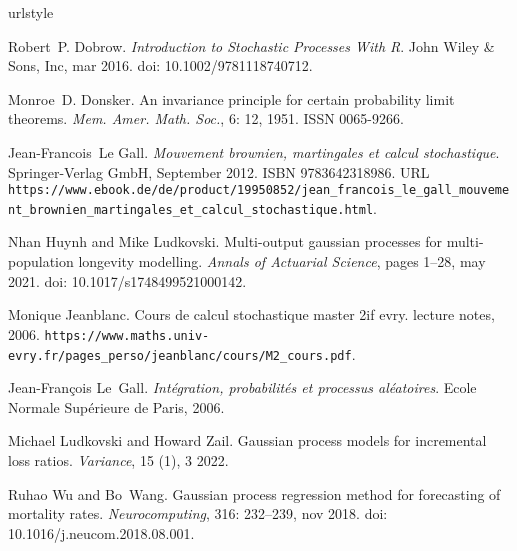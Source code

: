\begin{thebibliography}{8}
\providecommand{\natexlab}[1]{#1}
\providecommand{\url}[1]{\texttt{#1}}
\expandafter\ifx\csname urlstyle\endcsname\relax
  \providecommand{\doi}[1]{doi: #1}\else
  \providecommand{\doi}{doi: \begingroup \urlstyle{rm}\Url}\fi

Robert~P. Dobrow.
\newblock \emph{Introduction to Stochastic Processes With R}.
\newblock John Wiley {\&} Sons, Inc, mar 2016.
\newblock \doi{10.1002/9781118740712}.

Monroe~D. Donsker.
\newblock An invariance principle for certain probability limit theorems.
\newblock \emph{Mem. Amer. Math. Soc.}, 6: 12, 1951.
\newblock ISSN 0065-9266.

Jean-Francois~Le Gall.
\newblock \emph{Mouvement brownien, martingales et calcul stochastique}.
\newblock Springer-Verlag GmbH, September 2012.
\newblock ISBN 9783642318986.
\newblock URL
  \url{https://www.ebook.de/de/product/19950852/jean_francois_le_gall_mouvement_brownien_martingales_et_calcul_stochastique.html}.

Nhan Huynh and Mike Ludkovski.
\newblock Multi-output gaussian processes for multi-population longevity
  modelling.
\newblock \emph{Annals of Actuarial Science}, pages 1--28, may 2021.
\newblock \doi{10.1017/s1748499521000142}.

Monique Jeanblanc.
\newblock Cours de calcul stochastique master 2if evry.
\newblock lecture notes, 2006.
\newblock
  \url{https://www.maths.univ-evry.fr/pages_perso/jeanblanc/cours/M2_cours.pdf}.

Jean-Fran{\c{c}}ois Le~Gall.
\newblock \emph{Int{\'e}gration, probabilit{\'e}s et processus al{\'e}atoires}.
\newblock Ecole Normale Sup{\'e}rieure de Paris, 2006.

Michael Ludkovski and Howard Zail.
\newblock Gaussian process models for incremental loss ratios.
\newblock \emph{Variance}, 15 (1), 3 2022.

Ruhao Wu and Bo~Wang.
\newblock Gaussian process regression method for forecasting of mortality
  rates.
\newblock \emph{Neurocomputing}, 316: 232--239, nov 2018.
\newblock \doi{10.1016/j.neucom.2018.08.001}.

\end{thebibliography}
